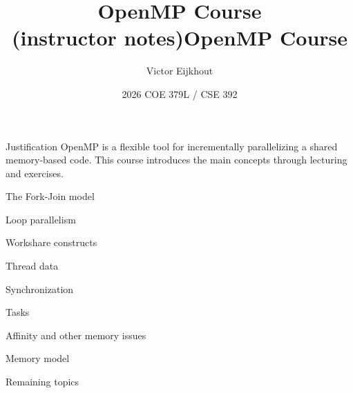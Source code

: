 \documentclass[10pt]{beamer}
\begin{document}
\author[Eijkhout]{Victor Eijkhout}
\date[2026]{2026 COE 379L / CSE 392}
\ifisinstructor
  \title[OMP]{OpenMP Course\\ (instructor notes)}
\else
  \title[OMP]{OpenMP Course}
\fi
\maketitle

\begin{frame}{Justification}
  OpenMP is a flexible tool for incrementally parallelizing a shared
  memory-based code.
  This course introduces the main concepts
  through lecturing and exercises.
\end{frame}

 {The Fork-Join model}


 {Loop parallelism}


 {Workshare constructs}


 {Thread data}


 {Synchronization}


 {Tasks}


 {Affinity and other memory issues}


 {Memory model}


 {Remaining topics}

\end{document}
